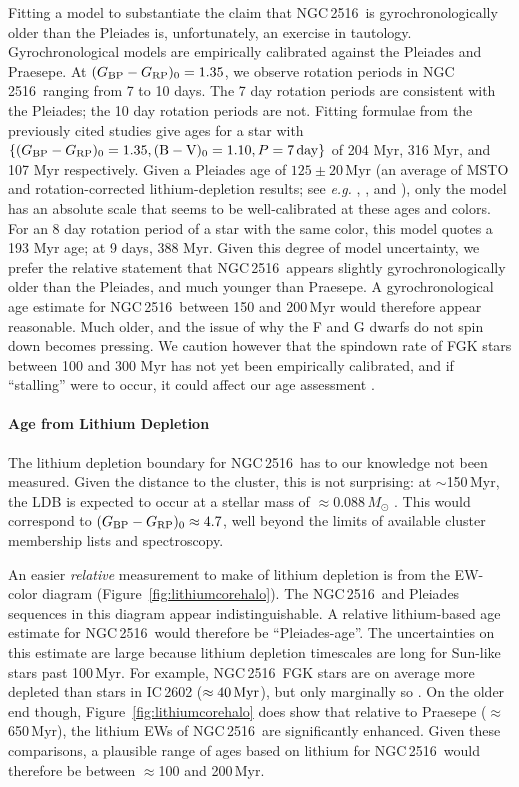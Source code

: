 \documentclass[12pt,twocolumn,tighten]{aastex63}
\newcommand{\cn}{NGC\,2516} %
\newcommand{\bpmrpo}{(G_{\rm BP}-G_{\rm RP})_0}
\begin{document}
Fitting a model to substantiate the claim that \cn\ is
gyrochronologically older than the Pleiades \citep[{\it e.g.},][]{mamajek_improved_2008,angus_toward_2019,spada_competing_2020}
is, unfortunately, an exercise in tautology.  Gyrochronological models
are empirically calibrated against the Pleiades and Praesepe.  At
$\bpmrpo=1.35$, we observe rotation periods in \cn\ ranging from 7 to
10 days.  The 7 day rotation periods are consistent with the Pleiades;
the 10 day rotation periods are not.  Fitting formulae from the
previously cited studies give ages for a star with $\{\bpmrpo=1.35,
(\mathrm{B}-\mathrm{V})_0=1.10, P=7\,{\rm day}\}$ of 204 Myr, 316 Myr,
and 107 Myr respectively.  Given a Pleiades age of $125\pm20$\,Myr (an
average of MSTO and rotation-corrected lithium-depletion results; see
{\it e.g.} \citealt{stauffer_keck_1998},
\citealt{soderblom_ages_2014}, and \citealt{cummings_2018}), only the
\citet{spada_competing_2020} model has an absolute scale that seems to
be well-calibrated at these ages and colors.  For an 8 day rotation
period of a star with the same color, this model quotes a 193 Myr age;
at 9 days, 388 Myr.  Given this degree of model uncertainty, we prefer
the relative statement that \cn\ appears slightly gyrochronologically
older than the Pleiades, and much younger than Praesepe.  A
gyrochronological age estimate for \cn\ between 150 and 200\,Myr would
therefore appear reasonable.  Much older, and the issue of why the F
and G dwarfs do not spin down becomes pressing.  We caution however
that the spindown rate of FGK stars between 100 and 300 Myr has not
yet been empirically calibrated, and if ``stalling'' were to occur, it
could affect our age assessment \citep[see][]{curtis_rup147_2020}.


\paragraph{Age from Lithium Depletion}
The lithium depletion boundary for \cn\ has to our knowledge not been
measured.  Given the distance to the cluster, this is not surprising:
at $\sim$150\,Myr, the LDB is expected to occur at a stellar mass of
$\approx$0.088\,$M_\odot$ \citep{soderblom_ages_2014}.  This would
correspond to $\bpmrpo\approx4.7$, well beyond the limits of available
cluster membership lists and spectroscopy.

An easier {\it relative} measurement to make of lithium depletion is
from the EW-color diagram (Figure~\ref{fig:lithiumcorehalo}).  The
\cn\ and Pleiades sequences in this diagram appear indistinguishable.
A relative lithium-based age estimate for \cn\ would therefore be
``Pleiades-age''.  The uncertainties on this estimate are large
because lithium depletion timescales are long for Sun-like stars past
100\,Myr.  For example,
\cn\ FGK stars are on average more depleted than stars in
IC\,2602 ($\approx40\,{\rm Myr}$), but only marginally so \citep{soderblom_ages_2014}.  On the
older end though, Figure~\ref{fig:lithiumcorehalo} does show that
relative to Praesepe ($\approx$650\,Myr), the lithium EWs of \cn\ are
significantly enhanced.  Given these comparisons, a plausible range of
ages based on lithium for \cn\ would therefore be between $\approx$100
and 200\,Myr.
\end{document}
